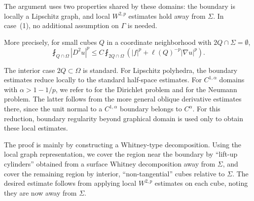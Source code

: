 \documentclass[12pt]{amsart}
\numberwithin{equation}{section}
\begin{document}
\medskip

The argument uses two properties shared by these domains: the boundary is locally a Lipschitz graph, and local $W^{2,p}$ estimates hold away from $\Sigma$. In case~{\rm (1)}, no additional assumption on $\Gamma$ is needed.

More precisely, for small cubes $Q$ in a coordinate neighborhood with $2Q\cap\Sigma = \emptyset$,
\begin{equation}
\label{eq:local-W2p-away-Sigma}
    \fint_{Q\cap\Omega}|D^2u|^p
    \leq C\fint_{2Q\cap\Omega}
    \left(|f|^p+\ell(Q)^{-p}|\nabla u|^p\right).
\end{equation}

The interior case $2Q \subset \Omega$ is standard. For Lipschitz polyhedra, the boundary estimates reduce locally to the standard half-space estimates. For $C^{1,\alpha}$ domains with $\alpha>1-1/p$, we refer to \cite{MR569375,MR4631039} for the Dirichlet problem and \cite{MR4387172} for the Neumann problem. The latter follows from the more general oblique derivative estimates there, since the unit normal to a $C^{1,\alpha}$ boundary belongs to $C^\alpha$. For this reduction, boundary regularity beyond graphical domain is used only to obtain these local estimates.

The proof is mainly by constructing a Whitney-type decomposition. Using the local graph representation, we cover the region near the boundary by ``lift-up cylinders'' obtained from a surface Whitney decomposition away from $\Sigma$, and cover the remaining region by interior, ``non-tangential'' cubes relative to $\Sigma$. The desired estimate follows from applying local $W^{2,p}$ estimates on each cube, noting they are now away from $\Sigma$.
\end{document}
